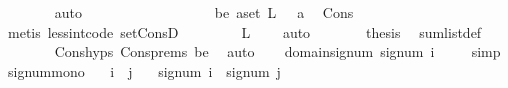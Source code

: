 \begin{isabellebody}
\ \ \ \ \ \ \isamarkupfalse%
\ auto\ \isanewline
\ \ \isamarkupfalse%
\isanewline
\ \ \ \ \isamarkupfalse%
\ {}\isanewline
\ \ \ \ \isamarkupfalse%
\ \isamarkupfalse%
\ \ be{\isacharcolon}{\kern0pt}\ {\isachardoublequoteopen}{\isasymexists}a{\isasymin}set\ L{\isachardot}{\kern0pt}\ {}\ {\isacharless}{\kern0pt}\ a{\isachardoublequoteclose}\ \isamarkupfalse%
\ Cons\isanewline
\ \ \ \ \ \ \isamarkupfalse%
\ {\isacharparenleft}{\kern0pt}metis\ less{\isacharunderscore}{\kern0pt}int{\isacharunderscore}{\kern0pt}code{\isacharparenleft}{\kern0pt}{}{\isacharparenright}{\kern0pt}\ set{\isacharunderscore}{\kern0pt}ConsD{\isacharparenright}{\kern0pt}\ \isanewline
\ \ \ \ \isamarkupfalse%
\ \isamarkupfalse%
\ {\isachardoublequoteopen}L\ {\isasymnoteq}\ {\isacharbrackleft}{\kern0pt}{\isacharbrackright}{\kern0pt}{\isachardoublequoteclose}\ \isamarkupfalse%
\ auto\isanewline
\ \ \ \ \isamarkupfalse%
\ \isamarkupfalse%
\ {\isacharquery}{\kern0pt}thesis\ \isamarkupfalse%
\ sum{\isacharunderscore}{\kern0pt}list{\isacharunderscore}{\kern0pt}def\ {}\isanewline
\ \ \ \ \ \ \isamarkupfalse%
\ Cons{\isachardot}{\kern0pt}hyps\ Cons{\isachardot}{\kern0pt}prems{\isacharparenleft}{\kern0pt}{}{\isacharparenright}{\kern0pt}\ be\ \isamarkupfalse%
\ auto\isanewline
\ \ \isamarkupfalse%
\isanewline
{}\isamarkupfalse%
%
\endisatagproof
{\isafoldproof}%
%
\isadelimproof
\isanewline
%
\endisadelimproof
\isanewline
{}\isamarkupfalse%
\ domain{\isacharunderscore}{\kern0pt}signum{\isacharcolon}{\kern0pt}\ {\isachardoublequoteopen}signum\ i\ {\isasymin}\ {\isacharbraceleft}{\kern0pt}{\isacharminus}{\kern0pt}{}{\isacharcomma}{\kern0pt}{}{\isacharcomma}{\kern0pt}{}{\isacharbraceright}{\kern0pt}{\isachardoublequoteclose}%
\isadelimproof
\ %
\endisadelimproof
%
\isatagproof
{}\isamarkupfalse%
\ simp%
\endisatagproof
{\isafoldproof}%
%
\isadelimproof
%
\endisadelimproof
\isanewline
\isanewline
{}\isamarkupfalse%
\ signum{\isacharunderscore}{\kern0pt}mono{\isacharcolon}{\kern0pt}\isanewline
\ \ \ {\isachardoublequoteopen}i\ {\isasymle}\ j{\isachardoublequoteclose}\isanewline
\ \ \ {\isachardoublequoteopen}signum\ i\ {\isasymle}\ signum\ j{\isachardoublequoteclose}%

\end{isabellebody}
